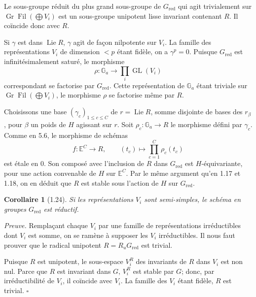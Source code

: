 \documentclass[10pt]{article}
\newcommand{\Ga}{\mathbb G_a}
\newcommand{\GL}{\operatorname{GL}}
\newcommand{\Lie}{\operatorname{Lie}}
\newcommand{\red}{\mathrm{red}}
\newcommand{\Fil}{\operatorname{Fil}}
\newcommand{\Gr}{\operatorname{Gr}}
\newcommand{\E}{\mathbb E}
\theoremstyle{deligne}
\newtheorem*{corollary*}{Corollaire}
\newenvironment{proofdel}{\textit{Preuve.}}{\hfill$\square$}
\begin{document}
Le sous-groupe réduit du plus grand sous-groupe de \(G_{\red}\) qui agit trivialement sur \(\Gr\Fil(\bigoplus V_i)\) est un sous-groupe unipotent lisse invariant contenant \(R\). Il coïncide donc avec \(R\).

Si \(\gamma\) est dans \(\Lie R\), \(\gamma\) agit de façon nilpotente sur \(V_i\). La famille des représentations \(V_i\) de dimension \(<p\) étant fidèle, on a \(\gamma^p=0\). Puisque \(G_{\red}\) est infinitésimalement saturé, le morphisme
\[
\rho:\Ga\longrightarrow\prod_i \GL(V_i)
\]
correspondant se factorise par \(G_{\red}\). Cette représentation de \(\Ga\) étant triviale sur \(\Gr\Fil(\bigoplus V_i)\), le morphisme \(\rho\) se factorise même par \(R\).

Choisissons une base \((\gamma_c)_{1\le c\le C}\) de \(r=\Lie R\), somme disjointe de bases des \(r_\beta\), pour \(\beta\) un poids de \(H\) agissant sur \(r\). Soit \(\rho_c:\Ga\to R\) le morphisme défini par \(\gamma_c\). Comme en 5.6, le morphisme de schémas
\[
f:\E^C\longrightarrow R,\qquad (t_c)\longmapsto \prod_{c=1}^{C}\rho_c(t_c)
\]
est étale en \(0\). Son composé avec l'inclusion de \(R\) dans \(G_{\red}\) est \(H\)-équivariante, pour une action convenable de \(H\) sur \(\E^C\). Par le même argument qu'en 1.17 et 1.18, on en déduit que \(R\) est stable sous l'action de \(H\) sur \(G_{\red}\).

\begin{corollary*}[1.24]
Si les représentations \(V_i\) sont semi-simples, le schéma en groupes \(G_{\red}\) est réductif.
\end{corollary*}

\begin{proofdel}
Remplaçant chaque \(V_i\) par une famille de représentations irréductibles dont \(V_i\) est somme, on se ramène à supposer les \(V_i\) irréductibles. Il nous faut prouver que le radical unipotent \(R=R_uG_{\red}\) est trivial.

Puisque \(R\) est unipotent, le sous-espace \(V_i^R\) des invariants de \(R\) dans \(V_i\) est non nul. Parce que \(R\) est invariant dans \(G\), \(V_i^R\) est stable par \(G\); donc, par irréductibilité de \(V_i\), il coïncide avec \(V_i\). La famille des \(V_i\) étant fidèle, \(R\) est trivial.
\end{proofdel}
\end{document}
